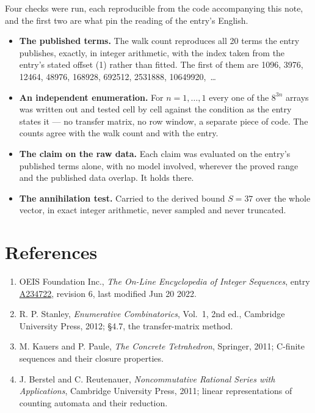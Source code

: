 \documentclass[11pt]{article}
\theoremstyle{definition}
\begin{document}
Four checks were run, each reproducible from the code accompanying this note, and the first two are what pin the reading of the entry's English.

\begin{itemize}

\item {\bfseries The published terms.} The walk count reproduces all 20 terms the entry publishes, exactly, in integer arithmetic, with the index taken from the entry's stated offset (1) rather than fitted. The first of them are 1096, 3976, 12464, 48976, 168928, 692512, 2531888, 10649920,~\dots

\item {\bfseries An independent enumeration.} For $n = 1,\dots,1$ every one of the $8^{3n}$ arrays was written out and tested cell by cell against the condition as the entry states it --- no transfer matrix, no row window, a separate piece of code. The counts agree with the walk count and with the entry.

\item {\bfseries The claim on the raw data.} Each claim was evaluated on the entry's published terms alone, with no model involved, wherever the proved range and the published data overlap. It holds there.

\item {\bfseries The annihilation test.} Carried to the derived bound $S = 37$ over the whole vector, in exact integer arithmetic, never sampled and never truncated.

\end{itemize}

\section{References}

\begin{enumerate}

\item OEIS Foundation Inc., \emph{The On-Line Encyclopedia of Integer Sequences}, entry \href{https://oeis.org/A234722}{A234722}, revision 6, last modified Jun 20 2022.

\item R. P. Stanley, \emph{Enumerative Combinatorics}, Vol.~1, 2nd ed., Cambridge University Press, 2012; \S4.7, the transfer-matrix method.

\item M. Kauers and P. Paule, \emph{The Concrete Tetrahedron}, Springer, 2011; C-finite sequences and their closure properties.

\item J. Berstel and C. Reutenauer, \emph{Noncommutative Rational Series with Applications}, Cambridge University Press, 2011; linear representations of counting automata and their reduction.

\end{enumerate}
\end{document}
